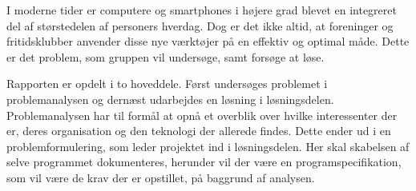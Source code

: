 I moderne tider er computere og smartphones i højere grad blevet en integreret del af størstedelen af
personers hverdag. Dog er det ikke altid, at foreninger og fritidsklubber anvender disse nye
værktøjer på en effektiv og optimal måde. Dette er det problem, som gruppen vil undersøge, samt forsøge at løse.

Rapporten er opdelt i to hoveddele. Først undersøges problemet i problemanalysen og dernæst udarbejdes en
løsning i løsningsdelen. Problemanalysen har til formål at opnå et overblik over hvilke interessenter der er,
deres organisation og den teknologi der allerede findes. Dette ender ud i en problemformulering, som leder
projektet ind i løsningsdelen. Her skal skabelsen af selve programmet dokumenteres, herunder vil der være en
programspecifikation, som vil være de krav der er opstillet, på baggrund af analysen. 
